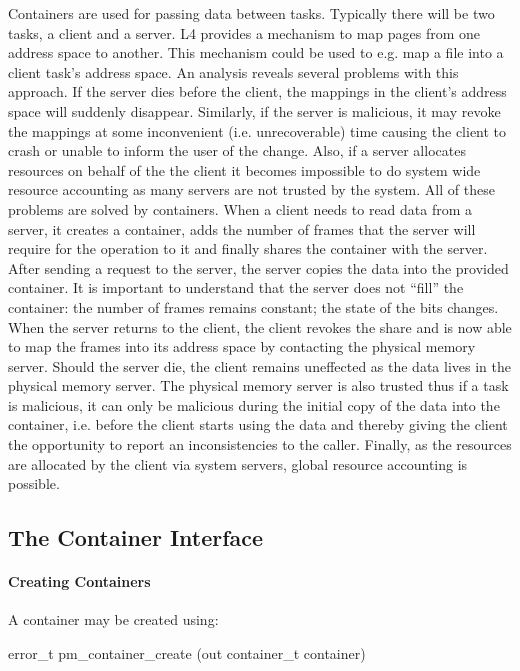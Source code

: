 Containers are used for passing data between tasks.  Typically there
will be two tasks, a client and a server.  L4 provides a mechanism to
map pages from one address space to another.  This mechanism could be
used to e.g. map a file into a client task's address space.  An
analysis reveals several problems with this approach.  If the server
dies before the client, the mappings in the client's address space
will suddenly disappear.  Similarly, if the server is malicious, it
may revoke the mappings at some inconvenient (i.e. unrecoverable) time
causing the client to crash or unable to inform the user of the
change.  Also, if a server allocates resources on behalf of the the
client it becomes impossible to do system wide resource accounting as
many servers are not trusted by the system.  All of these problems are
solved by containers.  When a client needs to read data from a server,
it creates a container, adds the number of frames that the server will
require for the operation to it and finally shares the container with
the server.  After sending a request to the server, the server copies
the data into the provided container.  It is important to understand
that the server does not ``fill'' the container: the number of frames
remains constant; the state of the bits changes.  When the server
returns to the client, the client revokes the share and is now able to
map the frames into its address space by contacting the physical
memory server.  Should the server die, the client remains uneffected
as the data lives in the physical memory server.  The physical memory
server is also trusted thus if a task is malicious, it can only be
malicious during the initial copy of the data into the container,
i.e. before the client starts using the data and thereby giving the
client the opportunity to report an inconsistencies to the caller.
Finally, as the resources are allocated by the client via system
servers, global resource accounting is possible.

\subsection{The Container Interface}

\paragraph{Creating Containers}

A container may be created using:

\begin{code}
error\_t pm\_container\_create (out container\_t container)
\end{code}

